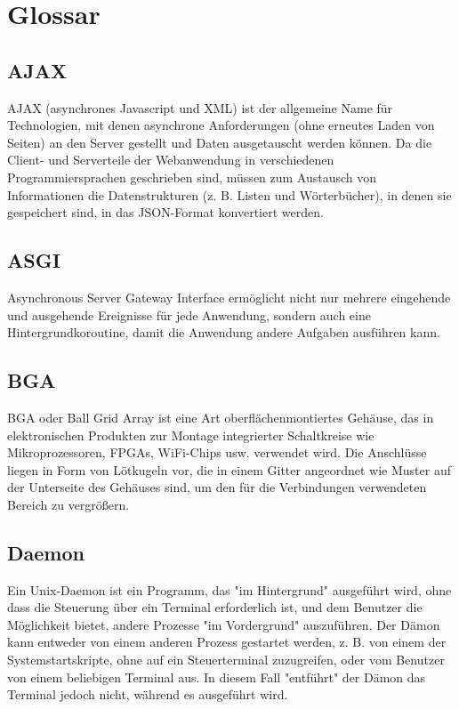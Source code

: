 \clearpage
{}
\chapter*{Glossar}
%
\section*{AJAX}
\label{sec:appendix:ajax}
AJAX (asynchrones Javascript und XML) ist der allgemeine Name für Technologien, mit denen asynchrone Anforderungen (ohne erneutes Laden von Seiten) an den Server gestellt und Daten ausgetauscht werden können. Da die Client- und Serverteile der Webanwendung in verschiedenen Programmiersprachen geschrieben sind, müssen zum Austausch von Informationen die Datenstrukturen (z. B. Listen und Wörterbücher), in denen sie gespeichert sind, in das JSON-Format konvertiert werden.

\section*{ASGI}
\label{sec:appendix:asgi}
Asynchronous Server Gateway Interface ermöglicht nicht nur mehrere eingehende und ausgehende Ereignisse für jede Anwendung, sondern auch eine Hintergrundkoroutine, damit die Anwendung andere Aufgaben ausführen kann.
\section*{BGA}
\label{sec:appendix:bga}
BGA oder Ball Grid Array ist eine Art oberflächenmontiertes Gehäuse, das in elektronischen Produkten zur Montage integrierter Schaltkreise wie Mikroprozessoren, FPGAs, WiFi-Chips usw. verwendet wird. Die Anschlüsse liegen in Form von Lötkugeln vor, die in einem Gitter angeordnet wie Muster auf der Unterseite des Gehäuses sind, um den für die Verbindungen verwendeten Bereich zu vergrößern.

\section*{Daemon}
\label{sec:appendix:daemon}
Ein Unix-Daemon ist ein Programm, das "im Hintergrund" ausgeführt wird, ohne dass die Steuerung über ein Terminal erforderlich ist, und dem Benutzer die Möglichkeit bietet, andere Prozesse "im Vordergrund" auszuführen. Der Dämon kann entweder von einem anderen Prozess gestartet werden, z. B. von einem der Systemstartskripte, ohne auf ein Steuerterminal zuzugreifen, oder vom Benutzer von einem beliebigen Terminal aus. In diesem Fall "entführt" der Dämon das Terminal jedoch nicht, während es ausgeführt wird.

